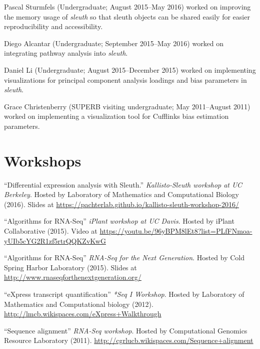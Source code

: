 \documentclass[11pt,notitlepage]{article} %
\begin{document}
\medskip

Pascal Sturmfels (Undergraduate; August 2015--May 2016) worked on improving the memory usage of \emph{sleuth} so that sleuth objects can be shared easily for easier reproducibility and accessibility.

\medskip

Diego Alcantar (Undergraduate; September 2015--May 2016) worked on integrating pathway analysis into \emph{sleuth}.

\medskip

Daniel Li (Undergraduate; August 2015--December 2015) worked on implementing visualizations for principal component analysis loadings and bias parameters in \emph{sleuth}.

\medskip

Grace Christenberry (SUPERB visiting undergraduate; May 2011--August 2011) worked on implementing a visualization tool for Cufflinks bias estimation parameters.

\newpage
\section*{Workshops}
\medskip
 ``Differential expression analysis with Sleuth.'' {\emph{Kallisto-Sleuth workshop at UC Berkeley}}. Hosted by Laboratory of Mathematics and Computational Biology (2016). Slides at \url{https://pachterlab.github.io/kallisto-sleuth-workshop-2016/}

\medskip

``Algorithms for RNA-Seq'' {\emph{iPlant workshop at UC Davis}}. Hosted by iPlant Collaborative (2015). Video at \url{https://youtu.be/96yBPM8lEt8?list=PLfFNmoa-yUIb5cYG2R1zf5rtrQQKZvKwG}

\medskip

``Algorithms for RNA-Seq'' {\emph{RNA-Seq for the Next Generation}}. Hosted by Cold Spring Harbor Laboratory (2015). Slides at \url{http://www.rnaseqforthenextgeneration.org/}

\medskip

``eXpress transcript quantification'' {\emph{*Seq I Workshop}}. Hosted by Laboratory of Mathematics and Computational biology (2012). \url{http://lmcb.wikispaces.com/eXpress+Walkthrough}

\medskip

``Sequence alignment'' {\emph{RNA-Seq workshop}}. Hosted by Computational Genomics Resource Laboratory (2011).  \url{http://cgrlucb.wikispaces.com/Sequence+alignment}

\bigskip
\end{document}
